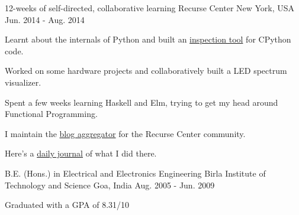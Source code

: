 

\begin{cventries}

  \cventry
      {12-weeks of self-directed, collaborative learning}
      {Recurse Center }
      {New York, USA} %
      {Jun. 2014 - Aug. 2014} %
      {
        \begin{cvitems} %
        \item {Learnt about the internals of Python and built an \href{https://github.com/punchagan/cinspect}{inspection tool} for CPython code.}
        \item {Worked on some hardware projects and collaboratively built a LED spectrum visualizer.}
        \item {Spent a few weeks learning Haskell and Elm, trying to get my head around Functional Programming.}
        \item {I maintain the \href{https://github.com/recursecenter/blaggregator/commits?author=punchagan}{blog aggregator} for the Recurse Center community.}
        \item {Here’s a \href{https://punchagan.muse-amuse.in/recurse-center/}{daily journal} of what I did there.}
        \end{cvitems}
      }
  \cventry
      {B.E. (Hons.) in Electrical and Electronics Engineering} %
      {Birla Institute of Technology and Science } %
      {Goa, India} %
      {Aug. 2005 - Jun. 2009} %
      {
        \begin{cvitems} %
        \item {Graduated with a GPA of 8.31/10}
        \end{cvitems}
      }
\end{cventries}
